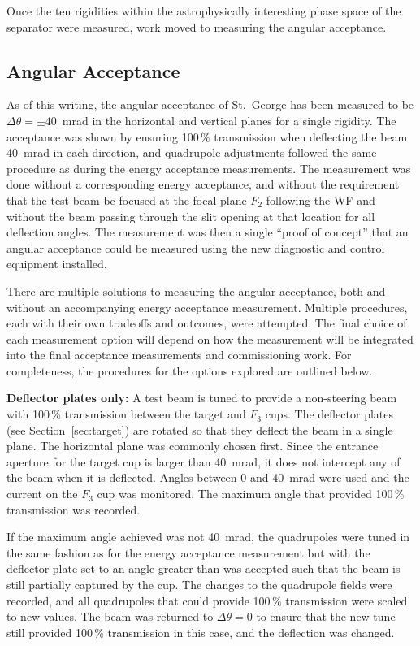 Once the ten rigidities within the astrophysically interesting phase
space of the separator were measured, work moved to measuring the
angular acceptance.


\subsection{Angular Acceptance}

As of this writing, the angular acceptance of St.\ George has been
measured to be $\Delta\theta = \pm 40$~mrad in the horizontal and
vertical planes for a single rigidity. The acceptance was shown by
ensuring 100\,\% transmission when deflecting the beam 40~mrad in each
direction, and quadrupole adjustments followed the same procedure as
during the energy acceptance measurements. The measurement was done
without a corresponding energy acceptance, and without the requirement
that the test beam be focused at the focal plane $F_2$ following the WF
and without the beam passing through the slit opening at that location
for all deflection angles. The measurement was then a single ``proof of
concept'' that an angular acceptance could be measured using the new
diagnostic and control equipment installed.

There are multiple solutions to measuring the angular acceptance, both
and without an accompanying energy acceptance measurement. Multiple
procedures, each with their own tradeoffs and outcomes, were attempted.
The final choice of each measurement option will depend on how the
measurement will be integrated into the final acceptance measurements
and commissioning work. For completeness, the procedures for the
options explored are outlined below.

\textbf{Deflector plates only:}
A test beam is tuned to provide a non-steering beam with 100\,\%
transmission between the target and $F_3$ cups. The deflector plates
(see Section~\ref{sec:target}) are rotated so that they deflect the beam
in a single plane. The horizontal plane was commonly chosen first. Since
the entrance aperture for the target cup is larger than 40~mrad, it does
not intercept any of the beam when it is deflected. Angles between 0 and
40~mrad were used and the current on the $F_3$ cup was monitored. The
maximum angle that provided 100\,\% transmission was recorded.

If the maximum angle achieved was not 40~mrad, the quadrupoles were
tuned in the same fashion as for the energy acceptance measurement but
with the deflector plate set to an angle greater than was accepted such
that the beam is still partially captured by the cup. The changes to the
quadrupole fields were recorded, and all quadrupoles that could provide
100\,\% transmission were scaled to new values. The beam was returned to
$\Delta\theta = 0$ to ensure that the new tune still provided 100\,\%
transmission in this case, and the deflection was changed.

